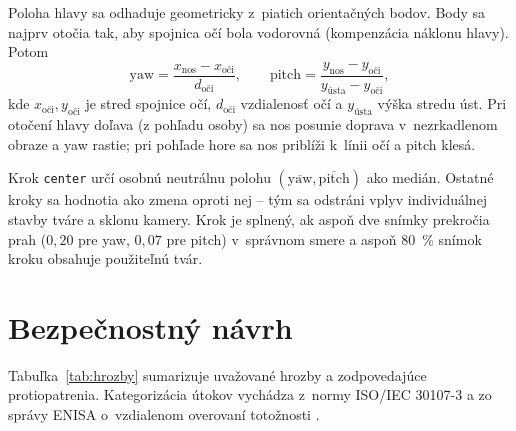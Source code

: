 Poloha hlavy sa odhaduje geometricky z~piatich orientačných bodov. Body sa najprv
otočia tak, aby spojnica očí bola vodorovná (kompenzácia náklonu hlavy). Potom
\begin{equation}
  \mathrm{yaw} = \frac{x_{\mathrm{nos}} - x_{\mathrm{oči}}}{d_{\mathrm{oči}}},
  \qquad
  \mathrm{pitch} = \frac{y_{\mathrm{nos}} - y_{\mathrm{oči}}}{y_{\mathrm{ústa}} - y_{\mathrm{oči}}},
\end{equation}
kde $x_{\mathrm{oči}}, y_{\mathrm{oči}}$ je stred spojnice očí, $d_{\mathrm{oči}}$
vzdialenosť očí a $y_{\mathrm{ústa}}$ výška stredu úst. Pri otočení hlavy doľava (z
pohľadu osoby) sa nos posunie doprava v~nezrkadlenom obraze a yaw rastie; pri pohľade
hore sa nos priblíži k~línii očí a pitch klesá.

Krok \texttt{center} určí osobnú neutrálnu polohu $(\overline{\mathrm{yaw}},
\overline{\mathrm{pitch}})$ ako medián. Ostatné kroky sa hodnotia ako zmena oproti nej
-- tým sa odstráni vplyv individuálnej stavby tváre a sklonu kamery. Krok je splnený,
ak aspoň dve snímky prekročia prah ($0{,}20$ pre yaw, $0{,}07$ pre pitch) v~správnom
smere a aspoň 80~\% snímok kroku obsahuje použiteľnú tvár.

\section{Bezpečnostný návrh}

Tabuľka~\ref{tab:hrozby} sumarizuje uvažované hrozby a zodpovedajúce protiopatrenia.
Kategorizácia útokov vychádza z~normy ISO/IEC 30107-3 \cite{iso30107-3} a zo správy
ENISA o~vzdialenom overovaní totožnosti \cite{enisa2022remote}.

